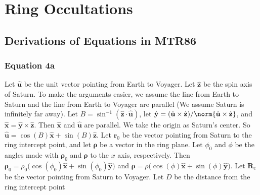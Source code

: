\documentclass[crop=false,class=article,oneside]{standalone}
\begin{document}
    \ifx\ifresearchnotesosthemathematicsofcassini\undefined
        \section*{Ring Occultations}
        \setcounter{section}{1}
        \renewcommand\thesubfigure{%
            \arabic{section}.\arabic{figure}.\arabic{subfigure}%
        }
    \fi
    \subsection{Derivations of Equations in MTR86}
        \subsubsection{Equation 4a}
            Let $\hat{\mathbf{u}}$ be the unit
            vector pointing from Earth to Voyager.
            Let $\hat{\mathbf{z}}$ be the spin axis of
            Saturn. To make the arguments easier,
            we assume the line from Earth to Saturn
            and the line from Earth to Voyager are
            parallel (We assume Saturn is infinitely far away).
            Let
            $B=\sin^{-1}(\hat{\mathbf{z}}\cdot \hat{\mathbf{u}})$,
            let
            $\hat{\mathbf{y}}%
             =(\hat{\mathbf{u}}\times%
              \hat{\mathbf{z}})/%
              \norm{\hat{\mathbf{u}}\times%
              \hat{\mathbf{z}}}$,
            and
            $\hat{\mathbf{x}}%
             =\hat{\mathbf{y}}\times \hat{\mathbf{z}}$.
            Then $\hat{\mathbf{x}}$ and $\hat{\mathbf{u}}$
            are parallel. We take the origin as Saturn's center.
            So
            $\hat{\mathbf{u}}%
             =\cos(B)\hat{\mathbf{x}}+\sin(B)\hat{\mathbf{z}}$.
            Let $\mathbf{r}_{0}$ be the vector pointing
            from Saturn to the ring intercept point,
            and let $\boldsymbol{\rho}$ be a vector in
            the ring plane. Let $\phi_{0}$ and
            $\phi$ be the angles made with
            $\boldsymbol{\rho}_{0}$ and $\boldsymbol{\rho}$
            to the $x$ axis, respectively. Then
            $\boldsymbol{\rho}_{0}%
             =\rho_{0}\big(\cos(\phi_0)\hat{\mathbf{x}}+%
              \sin(\phi_{0})\hat{\mathbf{y}}\big)$
            and
            $\boldsymbol{\rho}%
             =\rho\big(\cos(\phi)\hat{\mathbf{x}}+%
              \sin(\phi)\hat{\mathbf{y}}\big)$.
            Let $\mathbf{R}_{c}$ be the vector pointing
            from Saturn to Voyager. Let $D$ be the
            distance from the ring intercept point
\end{document}
